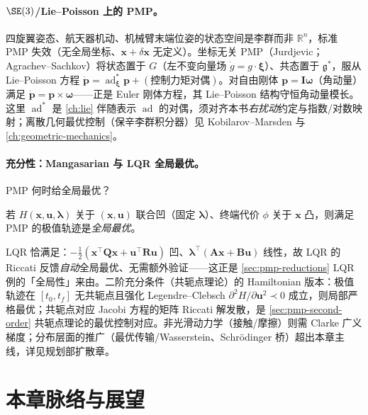 \paragraph{$\SE(3)$/Lie--Poisson 上的 PMP。}
四旋翼姿态、航天器机动、机械臂末端位姿的状态空间是李群而非 $\mathbb R^n$，标准 PMP 失效（无全局坐标、$\mathbf x+\delta\mathbf x$ 无定义）。坐标无关 PMP（Jurdjevic；Agrachev--Sachkov）将状态置于 $G$（左不变向量场 $\dot g=g\cdot\boldsymbol\xi$）、共态置于 $\mathfrak g^\ast$，服从 Lie--Poisson 方程 $\dot{\mathbf p}=\operatorname{ad}^\ast_{\boldsymbol\xi}\mathbf p+(\text{控制力矩对偶})$\cite{saccon2013optimal}。对自由刚体 $\mathbf p=\mathbf I\boldsymbol\omega$（角动量）满足 $\dot{\mathbf p}=\mathbf p\times\boldsymbol\omega$——正是 Euler 刚体方程，其 Lie--Poisson 结构守恒角动量模长。这里 $\operatorname{ad}^\ast$ 是 \cref{ch:lie} 伴随表示 $\operatorname{ad}$ 的对偶，须对齐本书\emph{右扰动}约定与指数/对数映射；离散几何最优控制（保辛李群积分器）见 Kobilarov--Marsden\cite{kobilarov2011discrete} 与 \cref{ch:geometric-mechanics}。

\paragraph{充分性：Mangasarian 与 LQR 全局最优。}
PMP 何时给全局最优？

\begin{theorem}\label{thm:pmp-mangasarian}
若 $H(\mathbf x,\mathbf u,\boldsymbol\lambda)$ 关于 $(\mathbf x,\mathbf u)$ 联合凹（固定 $\boldsymbol\lambda$）、终端代价 $\phi$ 关于 $\mathbf x$ 凸，则满足 PMP 的极值轨迹是\emph{全局最优}\cite{mangasarian1966sufficient}。
\end{theorem}

LQR 恰满足：$-\tfrac12(\mathbf x^\top\mathbf Q\mathbf x+\mathbf u^\top\mathbf R\mathbf u)$ 凹、$\boldsymbol\lambda^\top(\mathbf A\mathbf x+\mathbf B\mathbf u)$ 线性，故 LQR 的 Riccati 反馈\emph{自动}全局最优、无需额外验证——这正是 \cref{sec:pmp-reductions} LQR 例的「全局性」来由。二阶充分条件（共轭点理论）的 Hamiltonian 版本：极值轨迹在 $[t_0,t_f]$ 无共轭点且强化 Legendre--Clebsch $\partial^2 H/\partial\mathbf u^2\prec0$ 成立，则局部严格最优；共轭点对应 Jacobi 方程的矩阵 Riccati 解发散，是 \cref{sec:pmp-second-order} 共轭点理论的最优控制对应。非光滑动力学（接触/摩擦）则需 Clarke 广义梯度\cite{clarke1976maximum}；分布层面的推广（最优传输/Wasserstein、Schrödinger 桥）超出本章主线，详见规划部扩散章。

\section{本章脉络与展望}
\label{sec:pmp-outlook}

